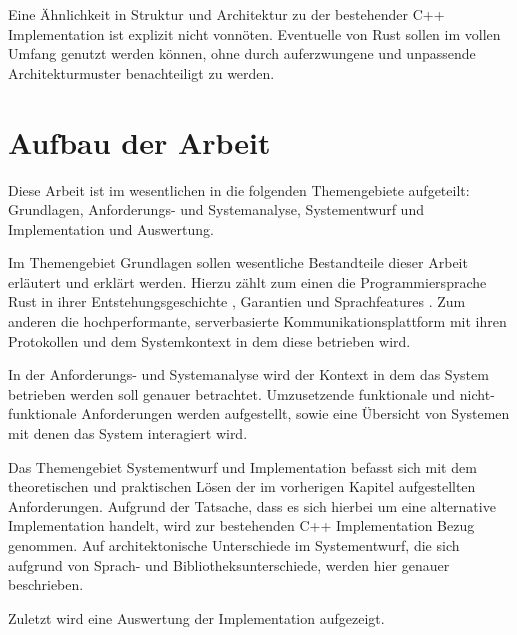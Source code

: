 Eine Ähnlichkeit in Struktur und Architektur zu der bestehender C++ Implementation ist explizit nicht vonnöten.
Eventuelle  von Rust sollen im vollen Umfang genutzt werden können, ohne durch auferzwungene und unpassende Architekturmuster benachteiligt zu werden.


\section{Aufbau der Arbeit}

Diese Arbeit ist im wesentlichen in die folgenden Themengebiete aufgeteilt: Grundlagen, Anforderungs- und Systemanalyse, Systementwurf und Implementation und Auswertung.

Im Themengebiet Grundlagen sollen wesentliche Bestandteile dieser Arbeit erläutert und erklärt werden.
Hierzu zählt zum einen die Programmiersprache Rust in ihrer Entstehungsgeschichte , Garantien   und Sprachfeatures .
Zum anderen die hochperformante, serverbasierte Kommunikationsplattform mit ihren Protokollen  und dem Systemkontext in dem diese betrieben wird.

In der Anforderungs- und Systemanalyse wird der Kontext in dem das System betrieben werden soll genauer betrachtet. Umzusetzende funktionale und nicht-funktionale Anforderungen werden aufgestellt, sowie eine Übersicht von Systemen mit denen das System interagiert wird.

Das Themengebiet Systementwurf und Implementation befasst sich mit dem theoretischen und praktischen Lösen der im vorherigen Kapitel aufgestellten Anforderungen. Aufgrund der Tatsache, dass es sich hierbei
um eine alternative Implementation handelt, wird zur bestehenden C++ Implementation Bezug genommen.
Auf architektonische Unterschiede im Systementwurf, die sich aufgrund von Sprach- und Bibliotheksunterschiede, werden hier genauer beschrieben.

Zuletzt wird eine Auswertung der Implementation aufgezeigt. 